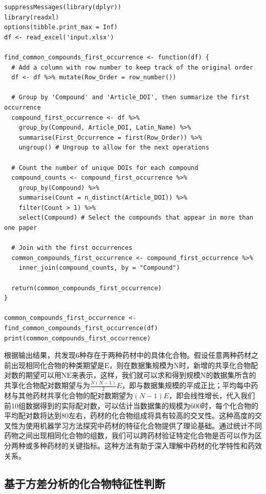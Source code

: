 \begin{lstlisting}
suppressMessages(library(dplyr))
library(readxl)
options(tibble.print_max = Inf)
df <- read_excel('input.xlsx')

find_common_compounds_first_occurrence <- function(df) {
  # Add a column with row number to keep track of the original order
  df <- df %>% mutate(Row_Order = row_number())
  
  # Group by 'Compound' and 'Article_DOI', then summarize the first occurrence
  compound_first_occurrence <- df %>%
    group_by(Compound, Article_DOI, Latin_Name) %>%
    summarise(First_Occurrence = first(Row_Order)) %>%
    ungroup() # Ungroup to allow for the next operations
  
  # Count the number of unique DOIs for each compound
  compound_counts <- compound_first_occurrence %>%
    group_by(Compound) %>%
    summarise(Count = n_distinct(Article_DOI)) %>%
    filter(Count > 1) %>%
    select(Compound) # Select the compounds that appear in more than one paper
  
  # Join with the first occurrences
  common_compounds_first_occurrence <- compound_first_occurrence %>%
    inner_join(compound_counts, by = "Compound")
  
  return(common_compounds_first_occurrence)
}

common_compounds_first_occurrence <- find_common_compounds_first_occurrence(df)
print(common_compounds_first_occurrence)  
\end{lstlisting}


根据输出结果，共发现6种存在于两种药材中的具体化合物。假设任意两种药材之前出现相同化合物的种类期望是$\mathrm{E}$，则在数据集规模为$\mathrm{N}$时，新增的共享化合物配对数的期望可以用$\mathrm{NE}$来表示，这样，我们就可以求和得到规模$\mathrm{N}$的数据集所含的共享化合物配对数期望与为$\frac{N(N-1)}{2}E$，即与数据集规模的平成正比；平均每中药材与其他药材共享化合物的配对数期望为$(N-1)E$，即会线性增长，代入我们前10组数据得到的实际配对数，可以估计当数据集的规模为600时，每个化合物的平均配对数将达到80左右，药材的化合物组成将具有较高的交叉性。这种高度的交叉性为使用机器学习方法探究中药材的特征化合物提供了理论基础。通过统计不同药物之间出现相同化合物的组数，我们可以跨药材验证特定化合物是否可以作为区分两种或多种药材的关键指标。这种方法有助于深入理解中药材的化学特性和药效关系。

\subsection{基于方差分析的化合物特征性判断}

